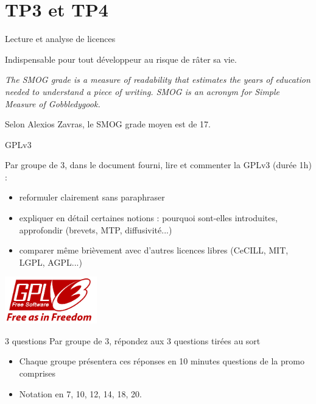 \documentclass{beamer}
\begin{document}
\section{TP3 et TP4}

\begin{frame}{Lecture et analyse de licences}

Indispensable pour tout développeur au risque de râter sa vie.

\textit{The SMOG grade is a measure of readability that estimates the years of education needed to understand a piece of writing. SMOG is an acronym for Simple Measure of Gobbledygook.}

Selon Alexios Zavras, le SMOG grade moyen est de 17.

\end{frame}


\begin{frame}{GPLv3}


  Par groupe de 3, dans le document fourni, lire et commenter la GPLv3 (durée 1h) :
  \begin{itemize}
    \item reformuler clairement sans paraphraser
    \item expliquer en détail certaines notions : pourquoi sont-elles introduites, approfondir (brevets, MTP, diffusivité...)
    \item comparer même brièvement avec d'autres licences libres (CeCILL, MIT, LGPL, AGPL...)
   \end{itemize}

  \begin{center}
    \includegraphics[width=0.3\textwidth]{images/gplv3.png}
\end{center}
\end{frame}

\begin{frame}{3 questions}
 Par groupe de 3, répondez aux 3 questions tirées au sort
 \begin{itemize}
 \item Chaque groupe présentera ces réponses en 10 minutes
   questions de la promo comprises
 \item Notation en 7, 10, 12, 14, 18, 20.
 \end{itemize}

\end{frame}
\end{document}
